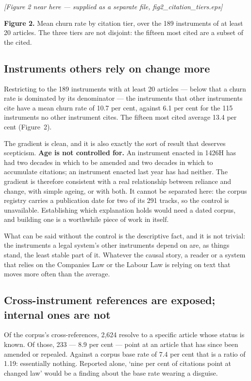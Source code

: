 \documentclass[11pt]{article}
\begin{document}
\bigskip
\noindent\textit{[Figure 2 near here --- supplied as a separate file, fig2\_citation\_tiers.eps]}

\noindent\textbf{Figure 2.} Mean churn rate by citation tier, over the 189 instruments of at
least 20 articles. The three tiers are not disjoint: the fifteen most cited
are a subset of the cited.
\bigskip


\subsection{Instruments others rely on change more}

Restricting to the 189 instruments with at least 20 articles --- below that a
churn rate is dominated by its denominator --- the instruments that other
instruments cite have a mean churn rate of 10.7 per cent, against 6.1 per cent
for the 115 instruments no other instrument cites. The fifteen most cited
average 13.4 per cent (Figure~2).

The gradient is clean, and it is also exactly the sort of result that deserves
scepticism. \textbf{Age is not controlled for.} An instrument enacted in
1426H has had two decades in which to be amended and two decades in which to
accumulate citations; an instrument enacted last year has had neither. The
gradient is therefore consistent with a real relationship between reliance and
change, with simple ageing, or with both. It cannot be separated here: the
corpus registry carries a publication date for two of its 291 tracks, so the
control is unavailable. Establishing which explanation holds would need a
dated corpus, and building one is a worthwhile piece of work in itself.

What can be said without the control is the descriptive fact, and it is not
trivial: the instruments a legal system's other instruments depend on are, as
things stand, the least stable part of it. Whatever the causal story, a reader
or a system that relies on the Companies Law or the Labour Law is relying on
text that moves more often than the average.

\subsection{Cross-instrument references are exposed; internal ones are not}

Of the corpus's cross-references, 2,624 resolve to a specific article whose
status is known. Of those, 233 --- 8.9 per cent --- point at an article that
has since been amended or repealed. Against a corpus base rate of 7.4 per cent
that is a ratio of 1.19: essentially nothing. Reported alone, `nine per cent
of citations point at changed law' would be a finding about the base rate
wearing a disguise.
\end{document}
